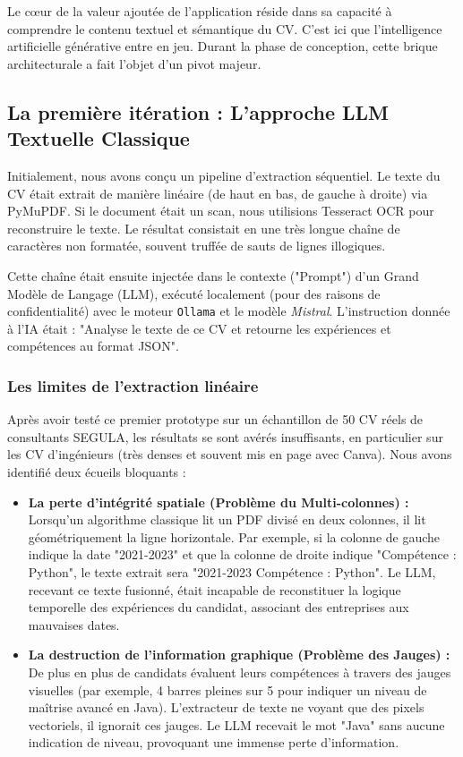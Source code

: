 Le cœur de la valeur ajoutée de l'application réside dans sa capacité à comprendre le contenu textuel et sémantique du CV. C'est ici que l'intelligence artificielle générative entre en jeu. Durant la phase de conception, cette brique architecturale a fait l'objet d'un pivot majeur.

\subsection{La première itération : L'approche LLM Textuelle Classique}
Initialement, nous avons conçu un pipeline d'extraction séquentiel. Le texte du CV était extrait de manière linéaire (de haut en bas, de gauche à droite) via PyMuPDF. Si le document était un scan, nous utilisions Tesseract OCR pour reconstruire le texte. Le résultat consistait en une très longue chaîne de caractères non formatée, souvent truffée de sauts de lignes illogiques.

Cette chaîne était ensuite injectée dans le contexte ("Prompt") d'un Grand Modèle de Langage (LLM), exécuté localement (pour des raisons de confidentialité) avec le moteur \texttt{Ollama} et le modèle \textit{Mistral}. 
L'instruction donnée à l'IA était : "Analyse le texte de ce CV et retourne les expériences et compétences au format JSON".

\subsubsection{Les limites de l'extraction linéaire}
Après avoir testé ce premier prototype sur un échantillon de 50 CV réels de consultants SEGULA, les résultats se sont avérés insuffisants, en particulier sur les CV d'ingénieurs (très denses et souvent mis en page avec Canva). Nous avons identifié deux écueils bloquants :

\begin{itemize}
    \item \textbf{La perte d'intégrité spatiale (Problème du Multi-colonnes) :} Lorsqu'un algorithme classique lit un PDF divisé en deux colonnes, il lit géométriquement la ligne horizontale. Par exemple, si la colonne de gauche indique la date "2021-2023" et que la colonne de droite indique "Compétence : Python", le texte extrait sera "2021-2023 Compétence : Python". Le LLM, recevant ce texte fusionné, était incapable de reconstituer la logique temporelle des expériences du candidat, associant des entreprises aux mauvaises dates.
    \item \textbf{La destruction de l'information graphique (Problème des Jauges) :} De plus en plus de candidats évaluent leurs compétences à travers des jauges visuelles (par exemple, 4 barres pleines sur 5 pour indiquer un niveau de maîtrise avancé en Java). L'extracteur de texte ne voyant que des pixels vectoriels, il ignorait ces jauges. Le LLM recevait le mot "Java" sans aucune indication de niveau, provoquant une immense perte d'information.
\end{itemize}

